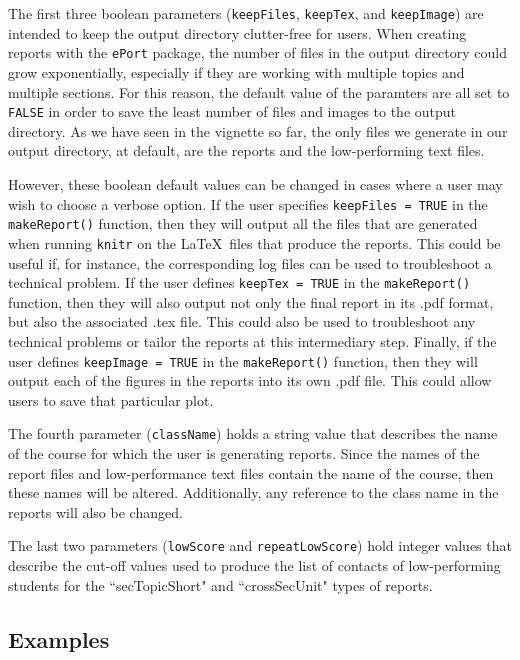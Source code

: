 \documentclass{article}\usepackage[]{graphicx}\usepackage[]{color}
\numberwithin{equation}{section} %
\begin{document}
The first three boolean parameters (\texttt{keepFiles}, \texttt{keepTex}, and \texttt{keepImage}) are intended to keep the output directory clutter-free for users. When creating reports with the \texttt{ePort} package, the number of files in the output directory could grow exponentially, especially if they are working with multiple topics and multiple sections. For this reason, the default value of the paramters are all set to \texttt{FALSE} in order to save the least number of files and images to the output directory. As we have seen in the vignette so far, the only files we generate in our output directory, at default, are the reports and the low-performing text files.

However, these boolean default values can be changed in cases where a user may wish to choose a verbose option. If the user specifies \texttt{keepFiles = TRUE} in the \texttt{makeReport()} function, then they will output all the files that are generated when running \texttt{knitr} on the \LaTeX\  files that produce the reports. This could be useful if, for instance, the corresponding log files can be used to troubleshoot a technical problem. If the user defines \texttt{keepTex = TRUE} in the \texttt{makeReport()} function, then they will also output not only the final report in its .pdf format, but also the associated .tex file. This could also be used to troubleshoot any technical problems or tailor the reports at this intermediary step. Finally, if the user defines \texttt{keepImage = TRUE} in the \texttt{makeReport()} function, then they will output each of the figures in the reports into its own .pdf file. This could allow users to save that particular plot.

The fourth parameter (\texttt{className}) holds a string value that describes the name of the course for which the user is generating reports. Since the names of the report files and low-performance text files contain the name of the course, then these names will be altered. Additionally, any reference to the class name in the reports will also be changed.

The last two parameters (\texttt{lowScore} and \texttt{repeatLowScore}) hold integer values that describe the cut-off values used to produce the list of contacts of low-performing students for the ``secTopicShort" and ``crossSecUnit" types of reports.

\subsection{Examples}
\end{document}
